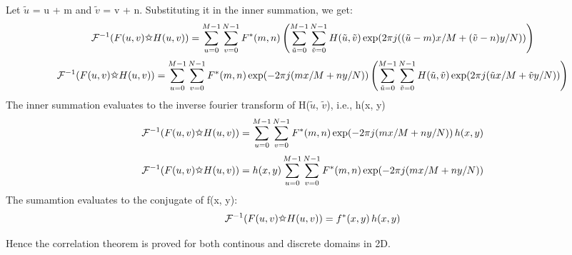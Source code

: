 \documentclass{article}
\begin{document}
\begin{enumerate}
Let $\tilde{u}$ = u + m and $\tilde{v}$ = v + n. Substituting it in the inner summation, we get:
\[
    \mathcal{F}^{-1}(F(u, v) \text{\ding{73}} H(u, v)) = \sum_{u=0}^{M-1} \sum_{v=0}^{N-1} F^*(m, n) \left( \sum_{\tilde{u}=0}^{M-1} \sum_{\tilde{v}=0}^{N-1} H(\tilde{u}, \tilde{v}) \exp(2 \pi j ((\tilde{u} - m)x/M + (\tilde{v} - n)y/N)) \right)
\]
\[
    \mathcal{F}^{-1}(F(u, v) \text{\ding{73}} H(u, v)) = \sum_{u=0}^{M-1} \sum_{v=0}^{N-1} F^*(m, n) \exp(-2 \pi j (mx/M + ny/N)) \left( \sum_{\tilde{u}=0}^{M-1} \sum_{\tilde{v}=0}^{N-1} H(\tilde{u}, \tilde{v}) \exp(2 \pi j (\tilde{u}x/M + \tilde{v}y/N)) \right)
\]
The inner summation evaluates to the inverse fourier transform of H($\tilde{u}$, $\tilde{v}$), i.e., h(x, y)
\[
    \mathcal{F}^{-1}(F(u, v) \text{\ding{73}} H(u, v)) = \sum_{u=0}^{M-1} \sum_{v=0}^{N-1} F^*(m, n) \exp(-2 \pi j (mx/M + ny/N)) \, h(x, y)
\]
\[
    \mathcal{F}^{-1}(F(u, v) \text{\ding{73}} H(u, v)) = h(x, y) \sum_{u=0}^{M-1} \sum_{v=0}^{N-1} F^*(m, n) \exp(-2 \pi j (mx/M + ny/N))
\]
The sumamtion evaluates to the conjugate of f(x, y):
\[
    \mathcal{F}^{-1}(F(u, v) \text{\ding{73}} H(u, v)) = f^*(x, y) \, h(x, y)
\]

Hence the correlation theorem is proved for both continous and discrete domains in 2D.
\end{enumerate}
\end{document}
